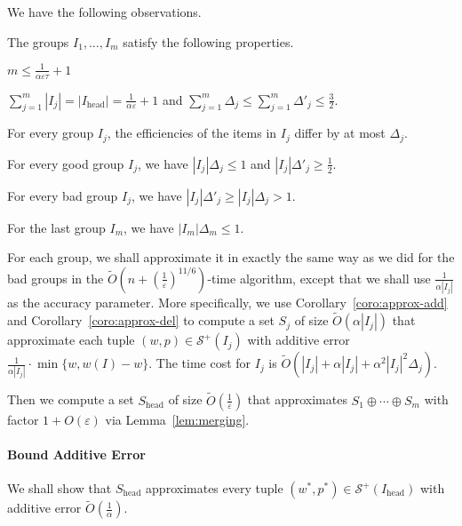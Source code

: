 \documentclass[a4paper,UKenglish,cleveref, autoref, thm-restate, pdfa]{lipics-v2021}
\newcommand{\eps}{\varepsilon}
\renewcommand{\leq}{\leqslant}
\renewcommand{\geq}{\geqslant}
\begin{document}
We have the following observations.
\begin{observation}\label{obs:group-property-incomp}
The groups $I_1, \ldots, I_m$ satisfy the following properties.
\begin{romanenumerate}
    \item $m \leq \frac{1}{\alpha\eps\tau} + 1$

    \item $\sum_{j=1}^{m}|I_j| = |I_{\mathrm{head}}| = \frac{1}{\alpha\eps} + 1$ and $\sum_{j=1}^{m}\Delta_j \leq \sum_{j=1}^{m}\Delta'_j \leq \frac{3}{2}$.

    \item For every group $I_j$, the efficiencies of the items in $I_j$ differ by at most $\Delta_j$.

    \item For every good group $I_j$, we have $|I_j|\Delta_j \leq 1$ and $|I_j|\Delta'_j \geq \frac{1}{2}$.

    \item For every bad group $I_j$, we have $|I_j|\Delta'_j \geq |I_j|\Delta_j > 1$.

    \item For the last group $I_m$, we have $|I_m|\Delta_m \leq 1$.
\end{romanenumerate}
\end{observation}


For each group, we shall approximate it in exactly the same way as we did for the bad groups in the $\tilde{O}(n + (\frac{1}{\eps})^{11/6})$-time algorithm, except that we shall use $\frac{1}{\alpha|I_j|}$ as the accuracy parameter. More specifically, we use Corollary~\ref{coro:approx-add} and Corollary~\ref{coro:approx-del} to compute a set $S_j$ of size $\tilde{O}(\alpha|I_j|)$ that approximate each tuple $(w, p) \in \mathcal{S}^+(I_j)$ with additive error $\frac{1}{\alpha|I_j|} \cdot \min\{w, w(I) - w\}$. The time cost for $I_j$ is $\tilde{O}(|I_j| + \alpha|I_j| + \alpha^2|I_j|^2\Delta_j)$.

Then we compute a set $S_{\mathrm{head}}$ of size $\tilde{O}(\frac{1}{\eps})$ that approximates $S_1 \oplus \cdots \oplus S_m$ with factor $1+O(\eps)$ via Lemma~\ref{lem:merging}. 

\paragraph*{Bound Additive Error}
We shall show that $S_{\mathrm{head}}$ approximates every tuple $(w^*, p^*) \in \mathcal{S}^+(I_{\mathrm{head}})$ with additive error $\tilde{O}(\frac{1}{\alpha})$. 
\end{document}
